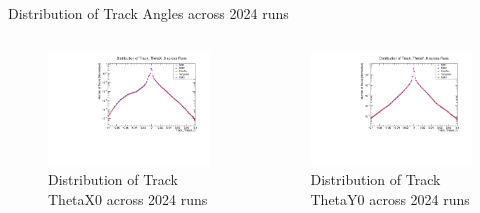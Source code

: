 \begin{frame}{Distribution of Track Angles across 2024 runs}
	\begin{columns}
		\begin{column}{0.5\linewidth}
			\begin{figure}
				\includegraphics[width=\linewidth]{./RunwisePlots/Track_ThetaX_0_runwise.pdf}
				\caption{Distribution of Track ThetaX0 across 2024 runs}
			\end{figure}
		\end{column}
		\begin{column}{0.5 \linewidth}
			\begin{figure}
				\includegraphics[width=\linewidth]{./RunwisePlots/Track_ThetaY_0_runwise.pdf}
				\caption{Distribution of Track ThetaY0 across 2024 runs}
			\end{figure}
		\end{column}	
	\end{columns}

\end{frame}


